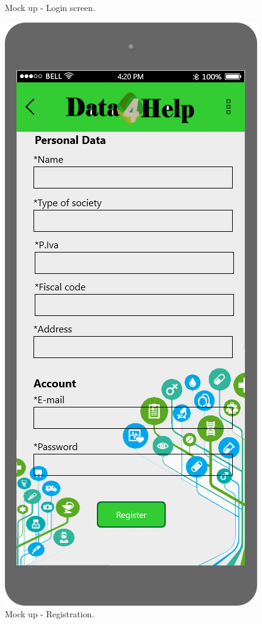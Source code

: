 \begin{figure}[h!]
\begin{minipage}[b]{0.2\textwidth}
    		\caption{Mock up - Login screen.}
  	\end{minipage}
	\hfill
 	\begin{minipage}[b]{0.2\textwidth}
    		\includegraphics[width=\textwidth]{./pictures/3p_registration.png}
    		\caption{Mock up - Registration.}
	\end{minipage}
\end{figure}
